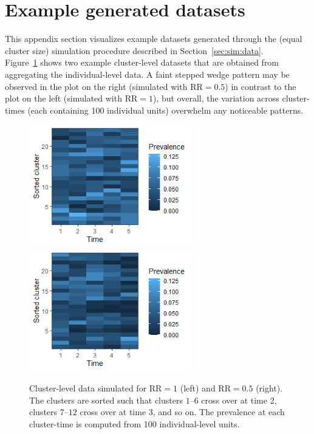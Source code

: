 \documentclass[10pt]{article}
\begin{document}
\newpage

\section{Example generated datasets} \label{apx:dataset}

This appendix section visualizes example datasets generated through the (equal cluster size) simulation procedure described in Section~\ref{sec:sim:data}.
\\

Figure~\ref{fig:data} shows two example cluster-level datasets that are obtained from aggregating the individual-level data. A faint stepped wedge pattern may be observed in the plot on the right (simulated with $\text{RR}=0.5$) in contrast to the plot on the left (simulated with $\text{RR}=1$), but overall, the variation across cluster-times (each containing 100 individual units) overwhelm any noticeable patterns.

\begin{figure}[H]
\centering
\includegraphics[width=7.1cm]{data1.png}
\includegraphics[width=7.1cm]{data05.png}
\caption{Cluster-level data simulated for $\text{RR}=1$ (left) and $\text{RR}=0.5$ (right). The clusters are sorted such that clusters $1$--$6$ cross over at time 2, clusters $7$--$12$ cross over at time 3, and so on. The prevalence at each cluster-time is computed from 100 individual-level units.}
\label{fig:data}
\end{figure}
\end{document}
